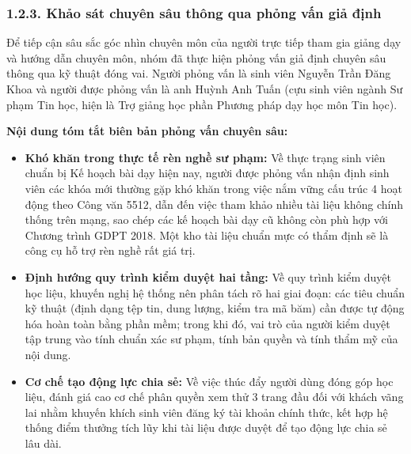 \subsubsection{1.2.3. Khảo sát chuyên sâu thông qua phỏng vấn giả định}
Để tiếp cận sâu sắc góc nhìn chuyên môn của người trực tiếp tham gia giảng dạy và hướng dẫn chuyên môn, nhóm đã thực hiện phỏng vấn giả định chuyên sâu thông qua kỹ thuật đóng vai. Người phỏng vấn là sinh viên Nguyễn Trần Đăng Khoa và người được phỏng vấn là anh Huỳnh Anh Tuấn (cựu sinh viên ngành Sư phạm Tin học, hiện là Trợ giảng học phần Phương pháp dạy học môn Tin học).

\noindent \textbf{Nội dung tóm tắt biên bản phỏng vấn chuyên sâu:}
\begin{itemize}[leftmargin=*,noitemsep]
    \item \textbf{Khó khăn trong thực tế rèn nghề sư phạm:} Về thực trạng sinh viên chuẩn bị Kế hoạch bài dạy hiện nay, người được phỏng vấn nhận định sinh viên các khóa mới thường gặp khó khăn trong việc nắm vững cấu trúc 4 hoạt động theo Công văn 5512, dẫn đến việc tham khảo nhiều tài liệu không chính thống trên mạng, sao chép các kế hoạch bài dạy cũ không còn phù hợp với Chương trình GDPT 2018. Một kho tài liệu chuẩn mực có thẩm định sẽ là công cụ hỗ trợ rèn nghề rất giá trị.
    \item \textbf{Định hướng quy trình kiểm duyệt hai tầng:} Về quy trình kiểm duyệt học liệu, khuyến nghị hệ thống nên phân tách rõ hai giai đoạn: các tiêu chuẩn kỹ thuật (định dạng tệp tin, dung lượng, kiểm tra mã băm) cần được tự động hóa hoàn toàn bằng phần mềm; trong khi đó, vai trò của người kiểm duyệt tập trung vào tính chuẩn xác sư phạm, tính bản quyền và tính thẩm mỹ của nội dung.
    \item \textbf{Cơ chế tạo động lực chia sẻ:} Về việc thúc đẩy người dùng đóng góp học liệu, đánh giá cao cơ chế phân quyền xem thử 3 trang đầu đối với khách vãng lai nhằm khuyến khích sinh viên đăng ký tài khoản chính thức, kết hợp hệ thống điểm thưởng tích lũy khi tài liệu được duyệt để tạo động lực chia sẻ lâu dài.
\end{itemize}
